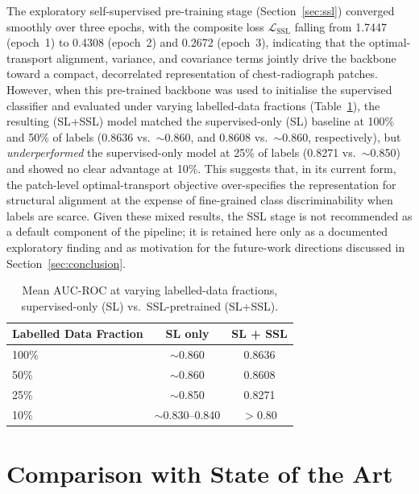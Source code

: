 \documentclass[preprint,12pt,authoryear]{elsarticle}
\begin{document}
The exploratory self-supervised pre-training stage (Section~\ref{sec:ssl}) converged smoothly over three epochs, with the composite loss $\mathcal{L}_{\text{SSL}}$ falling from 1.7447 (epoch~1) to 0.4308 (epoch~2) and 0.2672 (epoch~3), indicating that the optimal-transport alignment, variance, and covariance terms jointly drive the backbone toward a compact, decorrelated representation of chest-radiograph patches. However, when this pre-trained backbone was used to initialise the supervised classifier and evaluated under varying labelled-data fractions (Table~\ref{tab:label_efficiency}), the resulting (SL+SSL) model matched the supervised-only (SL) baseline at 100\% and 50\% of labels (0.8636 vs.\ $\sim$0.860, and 0.8608 vs.\ $\sim$0.860, respectively), but \emph{underperformed} the supervised-only model at 25\% of labels (0.8271 vs.\ $\sim$0.850) and showed no clear advantage at 10\%. This suggests that, in its current form, the patch-level optimal-transport objective over-specifies the representation for structural alignment at the expense of fine-grained class discriminability when labels are scarce. Given these mixed results, the SSL stage is not recommended as a default component of the pipeline; it is retained here only as a documented exploratory finding and as motivation for the future-work directions discussed in Section~\ref{sec:conclusion}.

\begin{table}[ht]
\centering
\caption{Mean AUC-ROC at varying labelled-data fractions, supervised-only (SL) vs.\ SSL-pretrained (SL+SSL).}
\label{tab:label_efficiency}
\renewcommand{\arraystretch}{1.2}
\begin{tabular}{lcc}
\toprule
\textbf{Labelled Data Fraction} & \textbf{SL only} & \textbf{SL + SSL} \\
\midrule
100\% & $\sim$0.860 & 0.8636 \\
50\%  & $\sim$0.860 & 0.8608 \\
25\%  & $\sim$0.850 & 0.8271 \\
10\%  & $\sim$0.830--0.840 & $>$0.80 \\
\bottomrule
\end{tabular}
\end{table}

\section{Comparison with State of the Art}
\label{sec:comparison}
\end{document}
